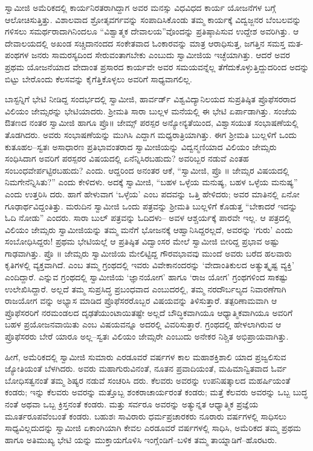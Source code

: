 ಸ್ವಾಮೀಜಿ ಅಮೆರಿಕದಲ್ಲಿ ಕಾರ್ಯನಿರತರಾಗಿದ್ದಾಗ ಅವರ ಮನಸ್ಸು ವಿಧವಿಧದ ಕಾರ್ಯ ಯೋಜನೆಗಳ ಬಗ್ಗೆ ಆಲೋಚಿಸುತ್ತಿತ್ತು. ವಿಶಾಲವಾದ ಶ್ರೋತೃವರ್ಗವನ್ನು ಸಂಪಾದಿಸಿಕೊಂಡು ತಮ್ಮ ಕಾರ್ಯಕ್ಕೆ ವಿದ್ವಜ್ಜನರ ಬೆಂಬಲವನ್ನು ಗಳಿಸಲು ಸಮರ್ಥರಾದಾಗಿನಿಂದಲೂ “ವಿಶ್ವಾತ್ಮಕ ದೇವಾಲಯ”ವೊಂದನ್ನು  ಪ್ರತಿಷ್ಠಾಪಿಸುವ ಉದ್ದೇಶ ಅವರಿಗಿತ್ತು. ಆ ದೇವಾಲಯದಲ್ಲಿ ಅಖಂಡ ಸಚ್ಚಿದಾನಂದದ ಸಂಕೇತವಾದ ಓಂಕಾರವನ್ನು ಮಾತ್ರ ಆರಾಧಿಸುತ್ತ, ಜಗತ್ತಿನ ಸಮಸ್ತ ಮತ-ಪಂಥಗಳ ಜನರು ಸಾಮರಸ್ಯದಿಂದ ಸೇರುವಂತಾಗಬೇಕು ಎಂಬುದು ಸ್ವಾಮೀಜಿಯ ಇಚ್ಛೆಯಾಗಿತ್ತು. ಆದರೆ ಅವರ ಪ್ರಥಮ ಯೋಜನೆಯಾದ ವೇದಾಂತ ಪ್ರಸಾರದ ಕಾರ್ಯವೇ ಅವರ ಸಮಯವನ್ನೆಲ್ಲ ತೆಗೆದುಕೊಳ್ಳುತ್ತಿದ್ದುದರಿಂದ ಅದನ್ನು ಬಿಟ್ಟು ಬೇರೊಂದು ಕೆಲಸವನ್ನು ಕೈಗೆತ್ತಿಕೊಳ್ಳಲು ಅವರಿಗೆ ಸಾಧ್ಯವಾಗಲಿಲ್ಲ.

ಬಾಸ್ಟನ್ನಿಗೆ ಭೇಟಿ ನೀಡಿದ್ದ ಸಂದರ್ಭದಲ್ಲಿ ಸ್ವಾಮೀಜಿ, ಹಾರ್ವರ್ಡ್ ವಿಶ್ವವಿದ್ಯಾನಿಲಯದ ಸುಪ್ರತಿಷ್ಠಿತ ಪ್ರೊಫೆಸರರಾದ ವಿಲಿಯಂ ಜೇಮ್ಸರನ್ನು ಭೇಟಿಯಾದರು. ಶ್ರೀಮತಿ ಸಾರಾ ಬುಲ್ಲಳ ಮನೆಯಲ್ಲಿ ಈ ಭೇಟಿ ಏರ್ಪಾಡಾಗಿತ್ತು. ಸಂಜೆಯ ಔತಣದ ನಂತರ ಸ್ವಾಮೀಜಿ ಹಾಗೂ ಪ್ರೊ॥ ಜೇಮ್ಸ್ ಪರಸ್ಪರ ಅನ್ಯೋನ್ಯತೆಯಿಂದ, ವಿಶ್ವಾಸಯುತ ಸಂಭಾಷಣೆಯಲ್ಲಿ ತೊಡಗಿದರು. ಅವರು ಸಂಭಾಷಣೆಯನ್ನು ಮುಗಿಸಿ ಎದ್ದಾಗ ಮಧ್ಯರಾತ್ರಿಯಾಗಿತ್ತು. ಈಗ ಶ್ರೀಮತಿ ಬುಲ್ಲಳಿಗೆ ಒಂದು ಕುತೂಹಲ–ಸ್ವತಃ ಅಸಾಧಾರಣ ಪ್ರತಿಭಾವಂತರಾದ ಸ್ವಾಮೀಜಿಯನ್ನು ವಿದ್ವನ್ಮಣಿಯಾದ ವಿಲಿಯಂ ಜೇಮ್ಸರು ಸಂಧಿಸಿದಾಗ ಅವರಿಗೆ ಪರಸ್ಪರರ ವಿಷಯದಲ್ಲಿ ಏನೆನ್ನಿಸಿರಬಹುದು? ಅವರಿಬ್ಬರ ನಡುವೆ ಎಂತಹ ಸಂಬಂಧವೇರ್ಪಟ್ಟಿರಬಹುದು? ಎಂದು. ಆದ್ದರಿಂದ ಅನಂತರ ಆಕೆ, “ಸ್ವಾಮೀಜಿ, ಪ್ರೊ ॥ ಜೇಮ್ಸರ ವಿಷಯದಲ್ಲಿ ನಿಮಗೇನೆನ್ನಿಸಿತು?” ಎಂದು ಕೇಳಿದಳು. ಅದಕ್ಕೆ ಸ್ವಾಮೀಜಿ, “ಬಹಳ ಒಳ್ಳೆಯ ಮನುಷ್ಯ, ಬಹಳ ಒಳ್ಳೆಯ ಮನುಷ್ಯ” ಎಂದು ಉತ್ತರಿಸಿ ದರು. ಹಾಗೆ ಹೇಳುವಾಗ ‘ಒಳ್ಳೆಯ’ ಎಂಬ ಪದವನ್ನು ಒತ್ತಿ ಹೇಳಿದರು; ಅವರ ಮಾತಿನಲ್ಲಿ ಏನೋ ಗೂಢಾರ್ಥವಿದ್ದಂತಿತ್ತು. ಮರುದಿನ ಸ್ವಾಮೀಜಿ ಒಂದು ಪತ್ರವನ್ನು ಶ್ರೀಮತಿ ಬುಲ್ಲಳಿಗೆ ಕೊಡುತ್ತ “ಬೇಕಾದರೆ ಇದನ್ನು ಓದಿ ನೋಡು” ಎಂದರು. ಸಾರಾ ಬುಲ್ ಪತ್ರವನ್ನು ಓದಿದಳು– ಅವಳ ಆಶ್ಚರ್ಯಕ್ಕೆ ಪಾರವೇ ಇಲ್ಲ. ಆ ಪತ್ರದಲ್ಲಿ ವಿಲಿಯಂ ಜೇಮ್ಸರು ಸ್ವಾಮೀಜಿಯನ್ನು ತಮ್ಮ ಮನೆಗೆ ಭೋಜನಕ್ಕೆ ಆಹ್ವಾನಿಸಿದ್ದರಲ್ಲದೆ, ಅವರನ್ನು ‘ಗುರು’ ಎಂದು ಸಂಬೋಧಿಸಿದ್ದರು! ಪ್ರಥಮ ಭೇಟಿಯಲ್ಲೆ ಆ ಪ್ರತಿಷ್ಠಿತ ವಿದ್ವಾಂಸರ ಮೇಲೆ ಸ್ವಾಮೀಜಿ ಬೀರಿದ್ದ ಪ್ರಭಾವ ಅಷ್ಟು ಗಾಢವಾಗಿತ್ತು. ಪ್ರೊ ॥ ಜೇಮ್ಸರು ಸ್ವಾಮೀಜಿಯ ಮೇಲಿಟ್ಟಿದ್ದ ಗೌರವಭಾವವು ಮುಂದೆ ಅವರು ಬರೆದ ಹಲವಾರು ಕೃತಿಗಳಲ್ಲಿ ವ್ಯಕ್ತವಾಗಿದೆ.  ಎಂಬ ತಮ್ಮ ಗ್ರಂಥದಲ್ಲಿ ಇವರು ವಿವೇಕಾನಂದರನ್ನು ‘ವೇದಾಂತಿಕುಲದ ಅತ್ಯುತ್ಕೃಷ್ಟ ವ್ಯಕ್ತಿ’ ಎಂದಿದ್ದಾರೆ.  ಎನ್ನುವ ಗ್ರಂಥದಲ್ಲಿ ಸ್ವಾಮೀಜಿಯ ‘ಜ್ಞಾನಯೋಗ’ ಹಾಗೂ ‘ರಾಜ ಯೋಗ’ ಗ್ರಂಥಗಳಿಂದ ಸಾಕಷ್ಟು ಉಲೇಖಿಸಿದ್ದಾರೆ. ಅಲ್ಲದೆ ತಮ್ಮ ಸುಪ್ರಸಿದ್ಧ ಪ್ರಬಂಧವಾದ  ಎಂಬುದರಲ್ಲಿ, ತಮ್ಮ ನರದೌರ್ಬಲ್ಯದ ನಿವಾರಣೆಗಾಗಿ ರಾಜಯೋಗ ವನ್ನು ಅಭ್ಯಾಸ ಮಾಡಿದ ಪ್ರೊಫೆಸರರೊಬ್ಬರ ವಿಷಯವನ್ನು ತಿಳಿಸುತ್ತಾರೆ. ತತ್ಪರಿಣಾಮವಾಗಿ ಆ ಪ್ರೊಫೆಸರರಿಗೆ ನರಮಂಡಲದ ದೃಢತೆಯುಂಟಾಯಿತಷ್ಟೇ ಅಲ್ಲದೆ ಬೌದ್ಧಿಕವಾಗಿಯೂ ಆಧ್ಯಾತ್ಮಿಕವಾಗಿಯೂ ಅವರಿಗೆ ಬಹಳ ಪ್ರಯೋಜನವಾಯಿತು ಎಂಬ ವಿಷಯವನ್ನೂ ಅದರಲ್ಲಿ ವಿವರಿಸುತ್ತಾರೆ. ಗ್ರಂಥದಲ್ಲಿ ಹೇಳಲಾಗಿರುವ ಆ ಪ್ರೊಫೆಸರರು ಬೇರೆ ಯಾರೂ ಅಲ್ಲ–ಸ್ವತಃ ವಿಲಿಯಂ ಜೇಮ್ಸರೇ ಎಂಬುದು ಅನೇಕರ ನಿಶ್ಚಿತ ಅಭಿಪ್ರಾಯವಾಗಿತ್ತು.

ಹೀಗೆ, ಅಮೆರಿಕದಲ್ಲಿ ಸ್ವಾಮೀಜಿ ಸುಮಾರು ಎರಡೂವರೆ ವರ್ಷಗಳ ಕಾಲ ಮಹಾಶಕ್ತಿಶಾಲಿ ಯಾದ ಪ್ರಜ್ವಲಿಸುವ ಜ್ಯೋತಿಯಂತೆ ಬೆಳಗಿದರು. ಅವರು ಮಹಾಗುರುವಿನಂತೆ, ನೂತನ ಪ್ರವಾದಿಯಂತೆ, ಮಹಿಮಾನ್ವಿತವಾದ ಓರ್ವ ಬೋಧಿಸತ್ವನಂತೆ ತಮ್ಮ ಶಿಷ್ಯರ ನಡುವೆ ಸಂಚರಿಸಿ ದರು. ಕೆಲವರು ಅವರನ್ನು ಉಪನಿಷತ್ಕಾಲದ ಮಹರ್ಷಿಯಂತೆ ಕಂಡರು; ಇನ್ನು ಕೆಲವರು ಅವರನ್ನು ಮತ್ತೊಬ್ಬ ಶಂಕರಾಚಾರ್ಯರಂತೆ ಕಂಡರು; ಮತ್ತೆ ಕೆಲವರು ಅವರನ್ನು ಒಬ್ಬ ಬುದ್ಧ ನಂತೆ ಅಥವಾ ಒಬ್ಬ ಕ್ರಿಸ್ತನಂತೆ ಕಂಡರು. ಮತ್ತು ಸರ್ವರೂ ಅವರನ್ನು ಅತ್ಯುನ್ನತ ಆಧ್ಯಾತ್ಮಿಕ ಪ್ರಜ್ಞೆಯ ಮೂರ್ತರೂಪವೆಂಬಂತೆ ಕಂಡರು. ಬಹುಶಃ ಸಾವಿರಾರು ಧರ್ಮಪ್ರಚಾರಕರು ನೂರಾರು ವರ್ಷಗಳಲ್ಲಿ ಸಾಧಿಸಲು ಸಾಧ್ಯವಿಲ್ಲದುದನ್ನು ಸ್ವಾಮೀಜಿ ಏಕಾಂಗಿಯಾಗಿ ಕೇವಲ ಎರಡೂವರೆ ವರ್ಷಗಳಲ್ಲಿ ಸಾಧಿಸಿ, ಅಮೆರಿಕದ ತಮ್ಮ ಪ್ರಥಮ ಹಾಗೂ ಅತಿಮುಖ್ಯ ಭೇಟಿ ಯನ್ನು ಮುಕ್ತಾಯಗೊಳಿಸಿ ಇಂಗ್ಲೆಂಡಿಗೆ–ಬಳಿಕ ತಮ್ಮ ತಾಯ್ನಾಡಿಗೆ–ಹೊರಟರು.

